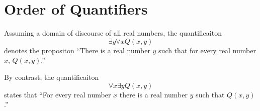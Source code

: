 \section{Order of Quantifiers}

Assuming a domain of discourse of all real numbers, the quantificaiton
\begin{equation}
  \exists y \forall x Q(x, y)
\end{equation}
denotes the propositon
``There is a real number $y$ such that for every real number $x$, $Q(x, y)$.''

By contrast, the quantificaiton
\begin{equation}
  \forall x \exists y Q(x, y)
\end{equation}
states that
``For every real number $x$ there is a real number $y$ such that $Q(x, y)$.''

